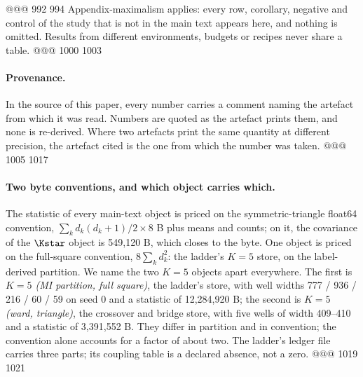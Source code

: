 @@@ 992 994
Appendix-maximalism applies: every row, corollary, negative and control of the study that is
not in the main text appears here, and nothing is omitted. Results from different
environments, budgets or recipes never share a table.
@@@ 1000 1003
\paragraph{Provenance.} In the source of this paper, every number carries a comment naming the
artefact from which it was read. Numbers are quoted as the artefact prints them, and none is
re-derived. Where two artefacts print the same quantity at different precision, the artefact
cited is the one from which the number was taken.
@@@ 1005 1017
\paragraph{Two byte conventions, and which object carries which.} The statistic of every
main-text object is priced on the symmetric-triangle float64 convention,
$\sum_k d_k(d_k+1)/2\times8$ B plus means and counts; on it, the covariance of the $\Kstar$
object is 549,120 B, which closes to the byte. %
One object is priced on the full-square convention, $8\sum_k d_k^2$: the ladder's $K=5$ store,
on the label-derived partition. We name the two $K=5$ objects apart everywhere. The first is
\emph{$K=5$ (MI partition, full square)}, the ladder's store, with well widths 777 / 936 / 216 / 60 /
59 on seed 0 and a statistic of 12,284,920 B; the second is \emph{$K=5$ (ward, triangle)}, the
crossover and bridge store, with five wells of width 409--410 and a statistic of 3,391,552 B.
They differ in partition and in convention; the convention alone accounts for a factor of about two.
The ladder's ledger file carries three parts; its coupling table is a declared absence, not a
zero. %
@@@ 1019 1021

